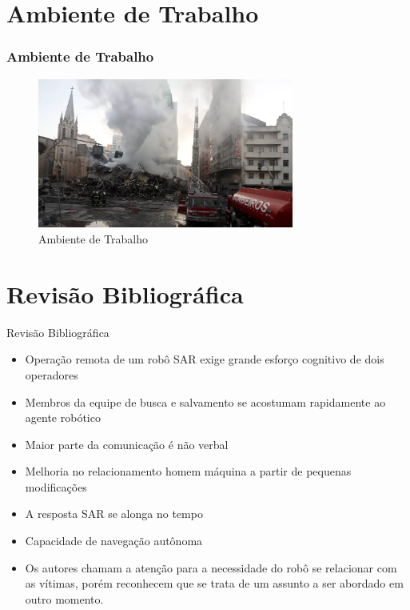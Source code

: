 \documentclass[aspectratio=169]{beamer}
\begin{document}
\section{Ambiente de Trabalho}
\begin{frame}
\frametitle{Ambiente de Trabalho}

\begin{figure}
  \centering
  \includegraphics[width=0.75\textwidth]{paisandu.png}
  \caption{Ambiente de Trabalho \cite{sp2020}}
\end{figure}

\end{frame}

\section{Revisão Bibliográfica}

\begin{frame}{Revisão Bibliográfica}
\begin{itemize}
\item Operação remota de um robô SAR exige grande esforço cognitivo de dois operadores \cite{Robin2004}
\item Membros da equipe de busca e salvamento se acostumam rapidamente ao agente robótico \cite{fin2004}
\item Maior parte da comunicação é não verbal \cite{fin2004}
\item Melhoria no relacionamento homem máquina a partir de pequenas modificações \cite{akgun2022using}
\item A resposta SAR se alonga no tempo \cite{krui2015}
\item Capacidade de navegação autônoma \cite{tardioli2016}
\item Os autores chamam a atenção para a necessidade do robô se relacionar com as vítimas, porém reconhecem que se trata de um assunto a ser abordado em outro momento.
\end{itemize}
\end{frame}
\end{document}
